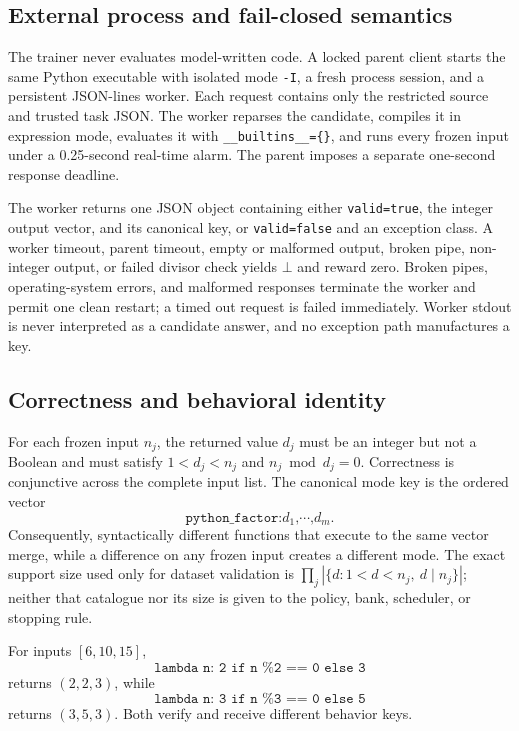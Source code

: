 \subsection{External process and fail-closed semantics}
\label{app:python-process}

The trainer never evaluates model-written code. A locked parent client starts
the same Python executable with isolated mode \texttt{-I}, a fresh process
session, and a persistent JSON-lines worker. Each request contains only the
restricted source and trusted task JSON. The worker reparses the candidate,
compiles it in expression mode, evaluates it with
\texttt{\_\_builtins\_\_=\{\}}, and runs every frozen input under a
0.25-second real-time alarm. The parent imposes a separate one-second response
deadline.

The worker returns one JSON object containing either
\texttt{valid=true}, the integer output vector, and its canonical key, or
\texttt{valid=false} and an exception class. A worker timeout, parent timeout,
empty or malformed output, broken pipe, non-integer output, or failed divisor
check yields $\bot$ and reward zero. Broken pipes, operating-system errors, and
malformed responses terminate the worker and permit one clean restart; a timed
out request is failed immediately. Worker stdout is never interpreted as a
candidate answer, and no exception path manufactures a key.

\subsection{Correctness and behavioral identity}
\label{app:python-identity}

For each frozen input $n_j$, the returned value $d_j$ must be an integer but
not a Boolean and must satisfy $1<d_j<n_j$ and
$n_j\bmod d_j=0$. Correctness is conjunctive across the complete input list.
The canonical mode key is the ordered vector
\[
  \texttt{python\_factor:}d_1\texttt{,}\cdots\texttt{,}d_m .
\]
Consequently, syntactically different functions that execute to the same
vector merge, while a difference on any frozen input creates a different
mode. The exact support size used only for dataset validation is
$\prod_j |\{d:1<d<n_j,\ d\mid n_j\}|$; neither that catalogue nor its size is
given to the policy, bank, scheduler, or stopping rule.

For inputs $[6,10,15]$,
\[
\texttt{lambda n: 2 if n \% 2 == 0 else 3}
\]
returns $(2,2,3)$, while
\[
\texttt{lambda n: 3 if n \% 3 == 0 else 5}
\]
returns $(3,5,3)$. Both verify and receive different behavior keys.


